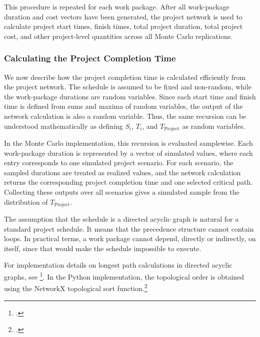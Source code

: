 \documentclass[11pt,a4paper]{article}
\newcommand{\1}{\mathbf{1}}
\theoremstyle{definition}
\theoremstyle{plain}
\theoremstyle{remark}
\numberwithin{equation}{section}
\begin{document}
This procedure is repeated for each work package. After all work-package duration and cost vectors have been generated, the project network is used to calculate project start times, finish times, total project duration, total project cost, and other project-level quantities across all Monte Carlo replications.

\subsubsection{Calculating the Project Completion Time}

We now describe how the project completion time is calculated efficiently from the project network. The schedule is assumed to be fixed and non-random, while the work-package durations are random variables. Since each start time and finish time is defined from sums and maxima of random variables, the output of the network calculation is also a random variable. Thus, the same recursion can be understood mathematically as defining $S_i$, $T_i$, and $T_{\text{Project}}$ as random variables.

In the Monte Carlo implementation, this recursion is evaluated samplewise. Each work-package duration is represented by a vector of simulated values, where each entry corresponds to one simulated project scenario. For each scenario, the sampled durations are treated as realized values, and the network calculation returns the corresponding project completion time and one selected critical path. Collecting these outputs over all scenarios gives a simulated sample from the distribution of $T_{\text{Project}}$.

The assumption that the schedule is a directed acyclic graph is natural for a standard project schedule. It means that the precedence structure cannot contain loops. In practical terms, a work package cannot depend, directly or indirectly, on itself, since that would make the schedule impossible to execute.

For implementation details on longest path calculations in directed acyclic graphs, see \footcite{hochbaum2024ieor266}. In the Python implementation, the topological order is obtained using the NetworkX topological sort function.\footcite{networkx2025topologicalsort}
\end{document}
